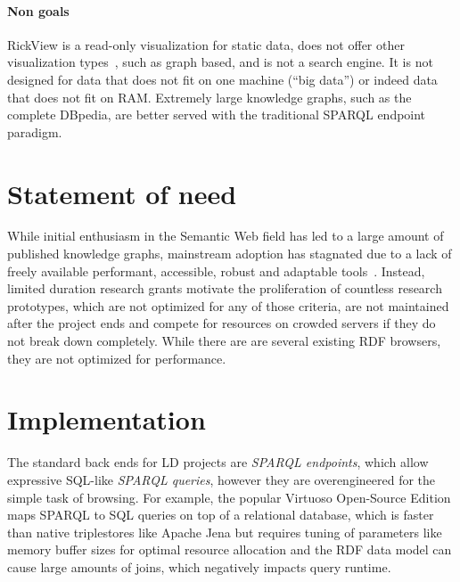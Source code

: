 \documentclass[runningheads]{llncs}
\newcommand\citep[1]{\cite{#1}}
\begin{document}
\paragraph{Non goals}
RickView is a read-only visualization for static data, does not offer other visualization types~\citep{linkeddatavisualization}, such as graph based, and is not a search engine.
It is not designed for data that does not fit on one machine (\enquote{big data}) or indeed data that does not fit on RAM.
Extremely large knowledge graphs, such as the complete DBpedia, are better served with the traditional SPARQL endpoint paradigm.

\section{Statement of need}\label{statement-of-need}

While initial enthusiasm in the Semantic Web field has led to a large amount of published knowledge graphs, mainstream adoption has stagnated due to a lack of freely available performant, accessible, robust and adaptable tools~\citep{semanticwebreview}.
Instead, limited duration research grants motivate the proliferation of countless research prototypes, which are not optimized for any of those criteria, are not maintained after the project ends and compete for resources on crowded servers if they do not break down completely.
While there are are several existing RDF browsers, they are not optimized for performance.

\section{Implementation}\label{implementation}

The standard back ends for LD projects are \emph{SPARQL endpoints}, which allow expressive SQL-like \emph{SPARQL queries}, however they are overengineered for the simple task of browsing.
For example, the popular Virtuoso Open-Source Edition maps SPARQL to SQL queries on top of a relational database, which is faster than native triplestores like Apache Jena but requires tuning of parameters like memory buffer sizes for optimal resource allocation and the RDF data model can cause large amounts of joins, which negatively impacts query runtime.
\end{document}
